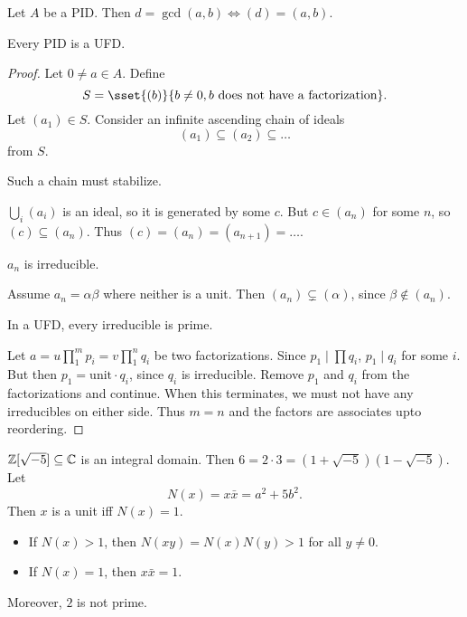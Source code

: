 \begin{proposition}
    Let $A$ be a PID.
    Then $d = \gcd(a, b) \iff (d) = (a, b)$.
\end{proposition}

\begin{theorem}
    Every PID is a UFD.
\end{theorem}
\begin{proof}
    Let $0 \ne a \in A$.
    Define
    \[
        S = \sset{(b)}{b \ne 0, b \text{ does not have a factorization}}.
    \]
    Let $(a_1) \in S$.
    Consider an infinite ascending chain of ideals \[
        (a_1) \subseteq (a_2) \subseteq \dots
    \] from $S$.
    \begin{claim}
        Such a chain must stabilize.
    \end{claim}
    \begin{subproof}
        $\bigcup_i (a_i)$ is an ideal, so it is generated by some $c$.
        But $c \in (a_n)$ for some $n$, so $(c) \subseteq (a_n)$.
        Thus $(c) = (a_n) = (a_{n+1}) = \dots$.
    \end{subproof}
    \begin{claim}
        $a_n$ is irreducible.
    \end{claim}
    \begin{subproof}
        Assume $a_n = \alpha \beta$ where neither is a unit.
        Then $(a_n) \subsetneq (\alpha)$, since $\beta \notin (a_n)$.
    \end{subproof}

    \begin{claim}
        In a UFD, every irreducible is prime.
    \end{claim}
    \begin{subproof}
    \end{subproof}

    Let $a = u \prod_1^m p_i = v \prod_1^n q_i$ be two factorizations.
    Since $p_1 \mid \prod q_i$, $p_1 \mid q_i$ for some $i$.
    But then $p_1 = \text{unit} \cdot q_i$, since $q_i$ is irreducible.
    Remove $p_1$ and $q_i$ from the factorizations and continue.
    When this terminates, we must not have any irreducibles
    on either side.
    Thus $m = n$ and the factors are associates upto reordering.
\end{proof}

\begin{examples}
    \item $\mathbb{Z}[\sqrt{-5}] \subseteq \mathbb{C}$ is an integral domain.
    Then $6 = 2 \cdot 3 = (1 + \sqrt{-5})(1 - \sqrt{-5})$.
    Let \[
        N(x) = x \bar x = a^2 + 5b^2.
    \] Then $x$ is a unit iff $N(x) = 1$.
    \begin{itemize}
        \item If $N(x) > 1$, then $N(xy) = N(x)N(y) > 1$ for all $y \ne 0$.
        \item If $N(x) = 1$, then $x \bar x = 1$.
    \end{itemize}

    Moreover, $2$ is not prime.
\end{examples}
